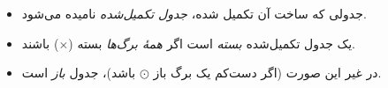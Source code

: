   \begin{definition}[تعریف \lr{2.65}]
    \hfill
    \begin{itemize}
      \item جدولی که ساخت آن تکمیل شده، \emph{جدول تکمیل‌شده} نامیده می‌شود.
      \item یک جدول تکمیل‌شده \emph{بسته} است اگر \emph{همهٔ برگ‌ها} بسته ($\times$) باشند.
      \item در غیر این صورت (اگر دست‌کم یک برگ باز $\odot$ باشد)، جدول \emph{باز} است.
    \end{itemize}
  \end{definition}